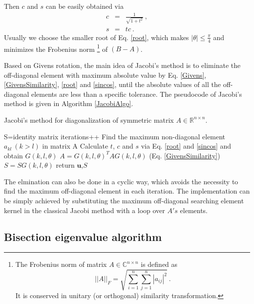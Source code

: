 \documentclass{article}
\begin{document}
Then $c$ and $s$ can be easily obtained via 
\begin{eqnarray}\label{sincos}
c&=&\frac{1}{\sqrt{1+t^2}}\ , \\ 
\nonumber
s&=&tc\ .
\end{eqnarray}
Usually we choose the smaller root of Eq. \ref{root}, which makes $|\theta|\leq\frac{\pi}{4}$ 
and minimizes the Frobenius norm
\footnote{The Frobenius norm of matrix $A\in \mathbb{C}^{n \times n}$ is defined as 
\begin{equation*}
||A||_{F} = \sqrt{\sum_{i=1}^{n}\sum_{j=1}^{n}|a_{ij}|^2}\ . 
\end{equation*}
It is conserved in unitary (or orthogonal) similarity transformation. }
of $(B-A)$. 
\par
Based on Givens rotation, the main idea of Jacobi's method is to eliminate the off-diagonal element with maximum absolute value  
by Eq. \ref{Givens}, \ref{GivensSimilarity}, \ref{root} and \ref{sincos}, 
until the absolute values of all the off-diagonal elements are less than a specific tolerance. 
The pseudocode of Jacobi's method is given in Algorithm \ref{JacobiAlgo}. 
\begin{algorithm}[tb]
	\label{JacobiAlgo}
	\caption{Jacobi's method for diagonalization of symmetric matrix $A\in \mathbb{R}^{n\times n}$. }
    S=identity matrix\; 
    {
    	iterations++\;
    	Find the maximum non-diagonal element $a_{kl}\ (k>l)$ in matrix A\; 
    	Calculate $t$, $c$ and $s$ via Eq. \ref{root} and \ref{sincos} and obtain $G(k,l,\theta)$\; 
	    $A=G(k,l,\theta)^{T}AG(k,l,\theta)$ (Eq. \ref{GivensSimilarity})\; 
	    $S=SG(k,l,\theta)$\;
    }
	return $\mathbf{u}$,$S$\;
\end{algorithm}
The elmination can also be done in a cyclic way, which avoids the necessity to find the maximum off-diagonal element in each iteration. The implementation can be simply achieved by substituting the maximum off-diagonal searching element kernel in the classical Jacobi method with a loop over $A's$ elements.

\subsection{Bisection eigenvalue algorithm} \label{bisection}

 
\end{document}
